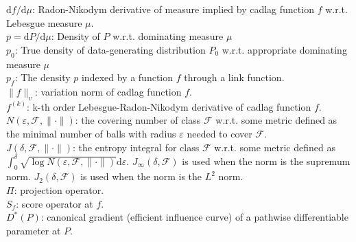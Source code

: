 $\mathrm{d}f/\mathrm{d}\mu$: Radon-Nikodym derivative of measure implied by cadlag function $f$ w.r.t. Lebesgue measure $\mu$.\\
$p = \mathrm{d}P/\mathrm{d}\mu$: Density of $P$ w.r.t. dominating measure $\mu$\\
$p_0$: True density of data-generating distribution $P_0$ w.r.t. appropriate dominating measure $\mu$\\
$p_f$: The density $p$ indexed by a function $f$ through a link function.\\
$\| f \|_v$: variation norm of cadlag function $f$.\\
$f^{(k)}$: k-th order Lebesgue-Radon-Nikodym derivative of cadlag function $f$. \\
$N(\varepsilon, \mathcal{F}, \| \cdot \|)$: the covering number of class $\mathcal{F}$ w.r.t. some metric defined as the minimal number of balls with radius $\varepsilon$ needed to cover $\mathcal{F}$.\\
$J(\delta, \mathcal{F}, \| \cdot \|)$: the entropy integral for class $\mathcal{F}$ w.r.t. some metric defined as $\int_0^{\delta} \sqrt{\log N(\varepsilon, \mathcal{F}, \| \cdot \|)} \mathrm{d}\varepsilon$. $J_{\infty}(\delta, \mathcal{F})$ is used when the norm is the supremum norm. $J_{2}(\delta, \mathcal{F})$ is used when the norm is the $L^2$ norm.\\
$\Pi$: projection operator.\\
$S_f$: score operator at $f$.\\
$D^*(P)$: canonical gradient (efficient influence curve) of a pathwise differentiable parameter at $P$.\\

